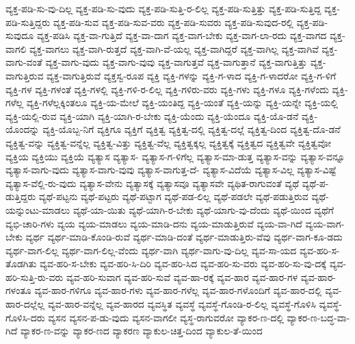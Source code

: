 {ವ್ಯಕ್ತ-ಪಡಿ-ಸು-ವು-ದಿಲ್ಲ
ವ್ಯಕ್ತ-ಪಡಿ-ಸು-ವುದು
ವ್ಯಕ್ತ-ಪಡಿ-ಸುತ್ತಿ-ರ-ಲಿಲ್ಲ
ವ್ಯಕ್ತ-ಪಡಿ-ಸುತ್ತಿತ್ತು
ವ್ಯಕ್ತ-ಪಡಿ-ಸುತ್ತಿದ್ದ
ವ್ಯಕ್ತ-ಪಡಿ-ಸುತ್ತಿದ್ದರು
ವ್ಯಕ್ತ-ಪಡಿ-ಸುವ
ವ್ಯಕ್ತ-ಪಡಿ-ಸುವ-ವರು
ವ್ಯಕ್ತ-ಪಡಿ-ಸುವರು
ವ್ಯಕ್ತ-ಪಡಿ-ಸುವುದ-ರಲ್ಲಿ
ವ್ಯಕ್ತ-ಪಡಿ-ಸುವುದೂ
ವ್ಯಕ್ತ-ಪಡಿಸಿ
ವ್ಯಕ್ತ-ವಾ-ಗುತ್ತಿದೆ
ವ್ಯಕ್ತ-ವಾ-ದಾಗ
ವ್ಯಕ್ತ-ವಾಗ-ಬೇಕು
ವ್ಯಕ್ತ-ವಾಗ-ಲಾ-ರದು
ವ್ಯಕ್ತ-ವಾಗದ
ವ್ಯಕ್ತ-ವಾಗಲಿ
ವ್ಯಕ್ತ-ವಾಗಲು
ವ್ಯಕ್ತ-ವಾಗಿ-ರುತ್ತದೆ
ವ್ಯಕ್ತ-ವಾಗಿ-ವೆ-ಯಲ್ಲ
ವ್ಯಕ್ತ-ವಾಗಿದ್ದರೆ
ವ್ಯಕ್ತ-ವಾಗಿಲ್ಲ
ವ್ಯಕ್ತ-ವಾಗಿವೆ
ವ್ಯಕ್ತ-ವಾಗು-ವಂತೆ
ವ್ಯಕ್ತ-ವಾಗು-ವುದು
ವ್ಯಕ್ತ-ವಾಗು-ವುವು
ವ್ಯಕ್ತ-ವಾಗುತ್ತವೆ
ವ್ಯಕ್ತ-ವಾಗುತ್ತಾನೆ
ವ್ಯಕ್ತ-ವಾಗುತ್ತಿತ್ತು
ವ್ಯಕ್ತ-ವಾಗುತ್ತಿರುವ
ವ್ಯಕ್ತ-ವಾಗುತ್ತಿರುವೆ
ವ್ಯಕ್ತಸ್ವ-ರೂಪ
ವ್ಯಕ್ತಿ
ವ್ಯಕ್ತಿ-ಗಳನ್ನು
ವ್ಯಕ್ತಿ-ಗ-ಳಾದ
ವ್ಯಕ್ತಿ-ಗ-ಳಾದರೋ
ವ್ಯಕ್ತಿ-ಗ-ಳಿಗೆ
ವ್ಯಕ್ತಿ-ಗಳ
ವ್ಯಕ್ತಿ-ಗಳಂತೆ
ವ್ಯಕ್ತಿ-ಗಳಲ್ಲಿ
ವ್ಯಕ್ತಿ-ಗಳಿ-ರ-ಲಿಲ್ಲ
ವ್ಯಕ್ತಿ-ಗಳಿರು-ವರು
ವ್ಯಕ್ತಿ-ಗಳು
ವ್ಯಕ್ತಿ-ಗಳೂ
ವ್ಯಕ್ತಿ-ಗಳೆಂದು
ವ್ಯಕ್ತಿ-ಗಳೆಲ್ಲ
ವ್ಯಕ್ತಿ-ಗಳೆಲ್ಲಕ್ಕಿಂತಲೂ
ವ್ಯಕ್ತಿ-ಯ-ಮೇಲೆ
ವ್ಯಕ್ತಿ-ಯಂತಿದ್ದ
ವ್ಯಕ್ತಿ-ಯಂತೆ
ವ್ಯಕ್ತಿ-ಯನ್ನು
ವ್ಯಕ್ತಿ-ಯನ್ನೇ
ವ್ಯಕ್ತಿ-ಯಲ್ಲಿ
ವ್ಯಕ್ತಿ-ಯಲ್ಲಿ-ರುವ
ವ್ಯಕ್ತಿ-ಯಾಗಿ
ವ್ಯಕ್ತಿ-ಯಾಗಿ-ರ-ಬೇಕು
ವ್ಯಕ್ತಿ-ಯೆಂದು
ವ್ಯಕ್ತಿ-ಯೆಂದೂ
ವ್ಯಕ್ತಿ-ಯೊ-ಡನೆ
ವ್ಯಕ್ತಿ-ಯೊಂದನ್ನು
ವ್ಯಕ್ತಿ-ಯೊಬ್ಬ-ನಿಗೆ
ವ್ಯಕ್ತಿಗೂ
ವ್ಯಕ್ತಿಗೆ
ವ್ಯಕ್ತಿತ್ವ
ವ್ಯಕ್ತಿತ್ವ-ದಲ್ಲಿ
ವ್ಯಕ್ತಿತ್ವ-ದಲ್ಲೆ
ವ್ಯಕ್ತಿತ್ವ-ದಿಂದ
ವ್ಯಕ್ತಿತ್ವ-ದೊ-ಡನೆ
ವ್ಯಕ್ತಿತ್ವ-ವನ್ನು
ವ್ಯಕ್ತಿತ್ವ-ವನ್ನೆಲ್ಲ
ವ್ಯಕ್ತಿತ್ವ-ವಿತ್ತು
ವ್ಯಕ್ತಿತ್ವ-ವೆಲ್ಲ
ವ್ಯಕ್ತಿತ್ವಕ್ಕಲ್ಲ
ವ್ಯಕ್ತಿತ್ವಕ್ಕೆ
ವ್ಯಕ್ತಿತ್ವದ
ವ್ಯಕ್ತಿತ್ವವೇ
ವ್ಯಕ್ತಿತ್ವವೋ
ವ್ಯಕ್ತಿಯ
ವ್ಯಕ್ತಿಯು
ವ್ಯಕ್ತಿಯೆ
ವ್ಯತ್ಯಾಸ
ವ್ಯತ್ಯಾಸ-
ವ್ಯತ್ಯಾಸ-ಗ-ಳಿಗೆಲ್ಲ
ವ್ಯತ್ಯಾಸ-ಮಾ-ಡುತ್ತ
ವ್ಯತ್ಯಾಸ-ವನ್ನು
ವ್ಯತ್ಯಾಸ-ವನ್ನೂ
ವ್ಯತ್ಯಾಸ-ವಾಗು-ವುದು
ವ್ಯತ್ಯಾಸ-ವಾಗು-ವುವು
ವ್ಯತ್ಯಾಸ-ವಾಗುತ್ತ-ದೆ-
ವ್ಯತ್ಯಾಸ-ವಿದೆಯೆ
ವ್ಯತ್ಯಾಸ-ವಿಲ್ಲ
ವ್ಯತ್ಯಾಸ-ವಿಷ್ಟೆ
ವ್ಯತ್ಯಾಸ-ವೆಲ್ಲಿ-ರು-ವುದು
ವ್ಯತ್ಯಾಸ-ವೇನು
ವ್ಯತ್ಯಾಸಕ್ಕೆ
ವ್ಯತ್ಯಾಸವೂ
ವ್ಯತ್ಯಾಸವೇ
ವ್ಯಥಿತ-ರಾಗುವಂತೆ
ವ್ಯಥೆ
ವ್ಯಥೆ-ಪ-ಡುತ್ತಿದ್ದರು
ವ್ಯಥೆ-ಪಟ್ಟನು
ವ್ಯಥೆ-ಪಟ್ಟರು
ವ್ಯಥೆ-ಪಟ್ಟಾಗ
ವ್ಯಥೆ-ಪಡ-ಲಿಲ್ಲ
ವ್ಯಥೆ-ಪಡಲೇ
ವ್ಯಥೆ-ಪಡುತ್ತಿರುವ
ವ್ಯಥೆ-ಯನ್ನುಂಟು-ಮಾಡಲು
ವ್ಯಥೆ-ಯಾ-ಯಿತು
ವ್ಯಥೆ-ಯಾಗಿ-ರ-ಬೇಕು
ವ್ಯಥೆ-ಯಾಗು-ವು-ದೆಂದು
ವ್ಯಥೆ-ಯಿಂದ
ವ್ಯಥೆಗೆ
ವ್ಯಭಿ-ಚಾರಿ-ಗಳು
ವ್ಯಯ
ವ್ಯಯ-ಮಾಡಲು
ವ್ಯಯ-ಮಾಡಿ-ದನು
ವ್ಯಯ-ಮಾಡುತ್ತಿರುವೆ
ವ್ಯಯ-ವಾ-ಗಿದೆ
ವ್ಯಯ-ವಾಗ-ಬೇಕು
ವ್ಯರ್ಥ
ವ್ಯರ್ಥ-ಮಾಡಿ-ಕೊಂಡಿ-ರುವೆ
ವ್ಯರ್ಥ-ಮಾಡಿ-ದಂತೆ
ವ್ಯರ್ಥ-ಮಾಡುತ್ತಿರು-ವೆವು
ವ್ಯರ್ಥ-ವಾಗ-ಕೂ-ಡದು
ವ್ಯರ್ಥ-ವಾಗ-ಲಿಲ್ಲ
ವ್ಯರ್ಥ-ವಾಗ-ಲಿಲ್ಲ-ವೆಂದು
ವ್ಯರ್ಥ-ವಾಗಿ
ವ್ಯರ್ಥ-ವಾಗು-ವು-ದಿಲ್ಲ
ವ್ಯವ-ಸಾ-ಯದ
ವ್ಯವ-ಹರಿ-ಸ-ತೊಡಗಿತು
ವ್ಯವ-ಹರಿ-ಸ-ಬೇಕು
ವ್ಯವ-ಹರಿ-ಸಿ-ದಿರಿ
ವ್ಯವ-ಹರಿ-ಸಿದ
ವ್ಯವ-ಹರಿ-ಸು-ವರು
ವ್ಯವ-ಹರಿ-ಸು-ವು-ದಕ್ಕೆ
ವ್ಯವ-ಹರಿ-ಸುತ್ತಿ-ರು-ವರು
ವ್ಯವ-ಹರಿ-ಸುವಾಗ
ವ್ಯವ-ಹರಿ-ಸುವೆ
ವ್ಯವ-ಹಾ-ರಕ್ಕೆ
ವ್ಯವ-ಹಾರ
ವ್ಯವ-ಹಾರ-ಗಳ
ವ್ಯವ-ಹಾರ-ಗಳಂತೂ
ವ್ಯವ-ಹಾರ-ಗಳಿಗೂ
ವ್ಯವ-ಹಾರ-ಗಳು
ವ್ಯವ-ಹಾರ-ಗಳೆಲ್ಲ
ವ್ಯವ-ಹಾರ-ಗಳೊಂದಿಗೆ
ವ್ಯವ-ಹಾರ-ದಲ್ಲಿ
ವ್ಯವ-ಹಾರ-ದಲ್ಲೆಲ್ಲ
ವ್ಯವ-ಹಾರ-ವನ್ನೆಲ್ಲ
ವ್ಯವ-ಹಾರದ
ವ್ಯವಸ್ಥಿತ
ವ್ಯವಸ್ಥೆ
ವ್ಯವಸ್ಥೆ-ಗೊಂಡಿ-ರ-ಲಿಲ್ಲ
ವ್ಯವಸ್ಥೆ-ಗೊಳಿಸಿ
ವ್ಯವಸ್ಥೆ-ಗೊಳಿಸಿ-ದರು
ವ್ಯಸನ
ವ್ಯಸನ-ಪ-ಡು-ವುದು
ವ್ಯಸನ-ವಾಗಲೀ
ವ್ಯಸ್ಥ-ರಾಗುವರೋ
ವ್ಯಾಕರ-ಣ-ದಲ್ಲಿ
ವ್ಯಾಕರ-ಣ-ಬದ್ಧ-ವಾ-ಗಿದೆ
ವ್ಯಾಕರ-ಣ-ವನ್ನು
ವ್ಯಾಕರ-ಣದ
ವ್ಯಾಕರಣ
ವ್ಯಾಕುಲ-ಚಿತ್ತ-ದಿಂದ
ವ್ಯಾಕುಲ-ತೆ-ಯಿಂದ
}

